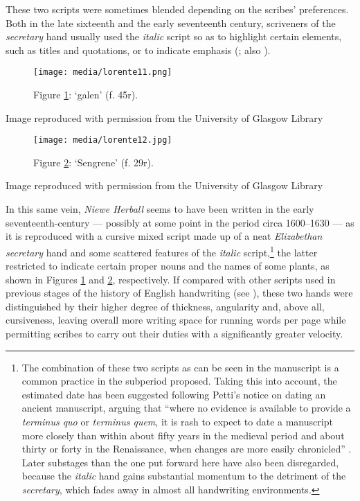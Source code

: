 \documentclass{article}
\begin{document}
These two scripts were sometimes blended depending on the scribes'
preferences. Both in the late sixteenth and the early seventeenth
century, scriveners of the \emph{secretary} hand usually used the
\emph{italic} script so as to highlight certain elements, such as titles
and quotations, or to indicate emphasis (\cite[9]{dawson_elizabethan_1966}; also \cite[29]{fairbank_renaissance_1960}).

\begin{figure}[H]
  \centering
    \texttt{[image: media/lorente11.png]}
    \caption{Figure \ref{fig:lorente11}: `galen' (f. 45r).}
    \label{fig:lorente11}
  \end{figure}


 Image reproduced with permission from the University of Glasgow Library 


 
  \begin{figure}
    \texttt{[image: media/lorente12.jpg]}
    \caption{Figure \ref{fig:lorente12}: `Sengrene' (f. 29r).}
    \label{fig:lorente12}
\end{figure}


 Image reproduced with permission from the University of Glasgow Library 


 
In this same vein, \emph{Niewe Herball} seems to have been written in
the early seventeenth-century –– possibly at some point in the period
circa 1600--1630 –– as it is reproduced with a cursive mixed script made up of
a neat \emph{Elizabethan secretary} hand and some scattered features of
the \emph{italic} script,\footnote{The combination of these two scripts as can be seen in the manuscript is a common practice in
  the subperiod proposed. Taking this into account, the estimated date
  has been suggested following Petti's notice on dating an ancient
  manuscript, arguing that ``where no evidence is available to provide a
  \emph{terminus quo} or \emph{terminus quem}, it is rash to expect to
  date a manuscript more closely than within about fifty years in the
  medieval period and about thirty or forty in the Renaissance, when
  changes are more easily chronicled'' \citep[33]{petti_english_1977}. Later substages than
  the one put forward here have also been disregarded, because the
  \emph{italic} hand gains substantial momentum to the detriment of the
  \emph{secretary}, which fades away in almost all handwriting
  environments.} the latter restricted to indicate certain proper nouns
and the names of some plants, as shown in Figures \ref{fig:lorente11} and \ref{fig:lorente12},
respectively. If compared with other scripts used in previous stages of
the history of English handwriting (see \cite{calle-martin_through_2011}), these two
hands were distinguished by their higher degree of thickness, angularity
and, above all, cursiveness, leaving overall more writing space for
running words per page while permitting scribes to carry out their
duties with a significantly greater velocity.
\end{document}
